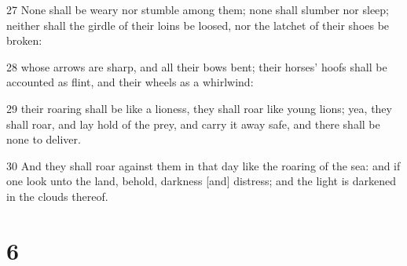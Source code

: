 \par 27 None shall be weary nor stumble among them; none shall slumber nor sleep; neither shall the girdle of their loins be loosed, nor the latchet of their shoes be broken:
\par 28 whose arrows are sharp, and all their bows bent; their horses' hoofs shall be accounted as flint, and their wheels as a whirlwind:
\par 29 their roaring shall be like a lioness, they shall roar like young lions; yea, they shall roar, and lay hold of the prey, and carry it away safe, and there shall be none to deliver.
\par 30 And they shall roar against them in that day like the roaring of the sea: and if one look unto the land, behold, darkness [and] distress; and the light is darkened in the clouds thereof.

\chapter{6}

